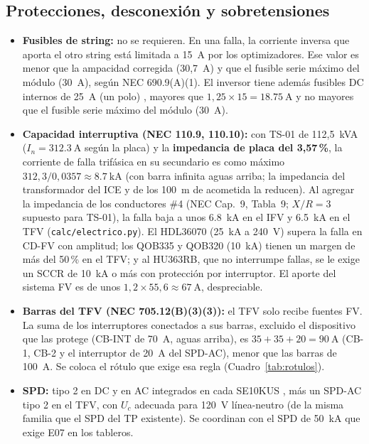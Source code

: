 \documentclass[12pt]{article}
\begin{document}
\subsection{Protecciones, desconexión y sobretensiones}
\begin{itemize}
\item \textbf{Fusibles de string:} no se requieren. En una falla, la corriente inversa que aporta el otro string está limitada a 15~A por los optimizadores. Ese valor es menor que la ampacidad corregida (30,7~A) y que el fusible serie máximo del módulo (30~A), según NEC 690.9(A)(1). El inversor tiene además fusibles DC internos de 25~A (un polo) \cite{seInv}, mayores que $1{,}25\times15=\SI{18.75}{\ampere}$ y no mayores que el fusible serie máximo del módulo (30~A).
\item \textbf{Capacidad interruptiva (NEC 110.9, 110.10):} con TS-01 de 112,5~kVA ($I_n=\SI{312.3}{\ampere}$ según la placa) y la \textbf{impedancia de placa del 3,57\,\%}, la corriente de falla trifásica en su secundario es como máximo $312{,}3/0{,}0357\approx\SI{8.7}{\kilo\ampere}$ (con barra infinita aguas arriba; la impedancia del transformador del ICE y de los 100~m de acometida la reducen). Al agregar la impedancia de los conductores \#4 (NEC Cap.~9, Tabla~9; $X/R=3$ supuesto para TS-01), la falla baja a unos \SI{6.8}{\kilo\ampere} en el IFV y \SI{6.5}{\kilo\ampere} en el TFV (\texttt{calc/electrico.py}). El HDL36070 (25~kA a 240~V) supera la falla en CD-FV con amplitud; los QOB335 y QOB320 (10~kA) tienen un margen de más del 50\,\% en el TFV; y al HU363RB, que no interrumpe fallas, se le exige un SCCR de 10~kA o más con protección por interruptor. El aporte del sistema FV es de unos $1{,}2\times55{,}6\approx\SI{67}{\ampere}$, despreciable.
\item \textbf{Barras del TFV (NEC 705.12(B)(3)(3)):} el TFV solo recibe fuentes FV. La suma de los interruptores conectados a sus barras, excluido el dispositivo que las protege (CB-INT de 70~A, aguas arriba), es $35+35+20=\SI{90}{\ampere}$ (CB-1, CB-2 y el interruptor de 20~A del SPD-AC), menor que las barras de 100~A. Se coloca el rótulo que exige esa regla (Cuadro~\ref{tab:rotulos}).
\item \textbf{SPD:} tipo 2 en DC y en AC integrados en cada SE10KUS \cite{seInv}, más un SPD-AC tipo 2 en el TFV, con $U_c$ adecuada para 120~V línea-neutro (de la misma familia que el SPD del TP existente). Se coordinan con el SPD de 50~kA que exige E07 en los tableros.

\end{itemize}
\end{document}
